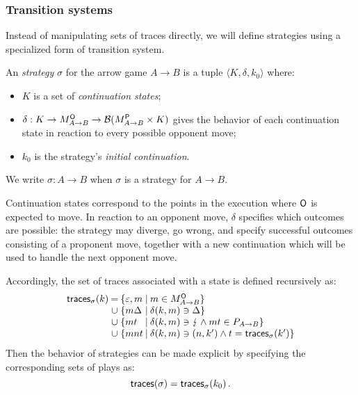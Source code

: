 
\subsubsection{Transition systems} %

Instead of manipulating sets of traces directly,
we will define strategies using a specialized form of transition system.

\begin{definition} %
\label{def:strat}
An \emph{strategy} $\sigma$ for the arrow game $A \rightarrow B$
is a tuple
$\langle K, \delta, k_0 \rangle$
where:
\begin{itemize}
  \item $K$ is a set of \emph{continuation states};
  \item $\delta : K \rightarrow M_{A \rightarrow B}^{ \mathsf{O} } \rightarrow
                  \mathcal{B}(M_{A \rightarrow B}^{ \mathsf{P} } \times K)$
    gives the behavior of each continuation state
    in reaction to every possible opponent move;
  \item $k_0$
    is the strategy's \emph{initial continuation}.
\end{itemize}
We write $\sigma : A \rightarrow B$ when $\sigma$ is a strategy
for $A \rightarrow B$.
\end{definition}

Continuation states correspond to
the points in the execution where $ \mathsf{O} $ is expected to move.
In reaction to an opponent move,
$\delta$ specifies which outcomes are possible:
the strategy may diverge, go wrong,
and specify successful outcomes
consisting of a proponent move,
together with a new continuation
which will be used to handle the next opponent move.

Accordingly,
the set of traces associated with a state is
defined recursively as:
\[
  \begin{array}{l@{\:}c@{\:\{}l@{\:\mid\:}l}
    \kw{traces}_\sigma(k) & = & \varepsilon, m &
      m \in M_{A \rightarrow B}^\kw{O} \} \\
    & \cup & m \Delta &
      \delta(k, m) \ni \Delta \} \\
    & \cup & mt &
      \delta(k, m) \ni \lightning \wedge mt \in P_{A \rightarrow B} \} \\
    & \cup & m n t &
      \delta(k, m) \ni (n, k') \wedge t = \kw{traces}_\sigma(k') \}
  \end{array}
\]
Then the behavior of strategies can be made explicit
by specifying the corresponding sets of plays as:
\[
   \mathsf{traces} (\sigma) =  \mathsf{traces} _\sigma(k_0) \,.
\]

